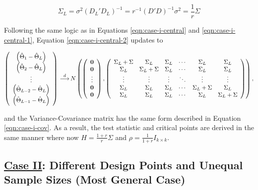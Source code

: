 \documentclass[useAMS]{cJAS2e}
\def\indist{\,{\buildrel d \over \longrightarrow}\,}
\begin{document}
\begin{equation}\label{eqn:case-ii-MSE}
	\Sigma_L = \sigma^2(D_L'D_L)^{-1}=r^{-1}(D'D)^{-1}\sigma^2 = \frac{1}{r}\Sigma
\end{equation}

\noindent Following the same logic as in Equations \eqref{eqn:case-i-central} and \eqref{eqn:case-i-central-1}, Equation \eqref{eqn:case-i-central-2} updates to

\begin{equation}\label{eqn:case-ii-central}
	\left(
		\begin{array}{c}
			\left(\hat{\Theta}_1 - \hat{\Theta}_L \right) \\
			\left(\hat{\Theta}_2 - \hat{\Theta}_L  \right) \\
			\vdots \\
			\left(\hat{\Theta}_{L-2} - \hat{\Theta}_L \right) \\
			\left(\hat{\Theta}_{L-1} - \hat{\Theta}_L  \right)
		\end{array}
	\right)  \indist N
	\left(	\left(
		\begin{array}{c}
			\mathbf{0} \\
			\mathbf{0} \\
			\vdots \\
			\mathbf{0} \\
			\mathbf{0}
		\end{array}
		\right),
		\left(
		\begin{array}{cccccc}
			\Sigma_L+\Sigma & \Sigma_L & \Sigma_L & \cdots & \Sigma_L & \Sigma_L \\
			\Sigma_L & \Sigma_L+\Sigma & \Sigma_L & \cdots & \Sigma_L & \Sigma_L \\
			\vdots & \vdots & \vdots & \ddots & \vdots & \vdots \\
			\Sigma_L & \Sigma_L & \Sigma_L & \cdots & \Sigma_L+\Sigma & \Sigma_L \\
			\Sigma_L & \Sigma_L & \Sigma_L & \cdots & \Sigma_L & \Sigma_L+\Sigma
		\end{array}
		\right)
	\right),
\end{equation}

\noindent and the Variance-Covariance matrix has the same form described in Equation \eqref{eqn:case-i-cov}.  As a result, the test statistic and critical points are derived in the same manner where now $H = \frac{1+r}{r} \Sigma$ and $\rho = \frac{1}{1+r}I_{k \times k}$.

\subsection*{\underline{Case II}: Different Design Points and Unequal Sample Sizes (Most General Case)}
\end{document}
